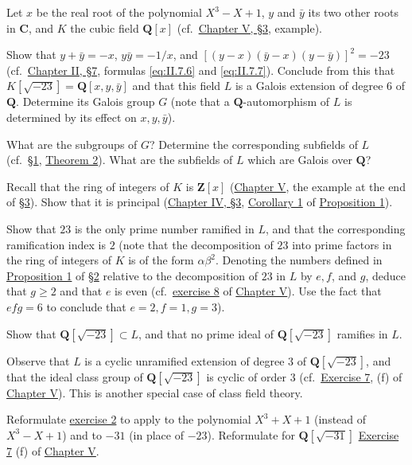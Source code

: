  Let $x$ be the real root of the polynomial $X^{3}-X+1$, $y$ and
$\bar{y}$ its two other roots in $\mathbf{C}$, and $K$ the cubic field
$\mathbf{Q}[x]$ (cf.\ \hyperref[sec:5.3]{Chapter V, §3}, example).
\begin{alist}
\item Show that $y+\bar{y}=-x$, $y\bar{y}=-1/x$, and
$[(y-x)(\bar{y}-x)(y-\bar{y})]^{2}=-23$ (cf.\ \hyperref[sec:2.7]{Chapter II, §7}, formulas
\eqref{eq:II.7.6} and \eqref{eq:II.7.7}). Conclude from this that
$K[\sqrt{-23}]=\mathbf{Q}[x,y,\bar{y}]$ and that this field $L$ is a Galois
extension of degree $6$ of $\mathbf{Q}$. Determine its Galois group $G$
(note that a $\mathbf{Q}$-automorphism of $L$ is determined by its effect on
$x,y,\bar{y}$).
\item What are the subgroups of $G$? Determine the corresponding subfields
of $L$ (cf.\ \hyperref[sec:6.1]{§1}, \hyperref[thm:VI.1.2]{Theorem 2}). What are the subfields of $L$ which are Galois
over $\mathbf{Q}$?
\item Recall that the ring of integers of $K$ is $\mathbf{Z}[x]$ (\hyperref[chap:V]{Chapter V},
the example at the end of \hyperref[sec:5.3]{§3}). Show that it is principal (\hyperref[sec:4.3]{Chapter IV, §3},
\hyperref[cor:IV.3.1]{Corollary 1} of \hyperref[prop:IV.3.1]{Proposition 1}).
\item Show that $23$ is the only prime number ramified in $L$, and that the
corresponding ramification index is $2$ (note that the decomposition of $23$
into prime factors in the ring of integers of $K$ is of the form
$\alpha\beta^{2}$. Denoting the numbers defined in \hyperref[prop:VI.2.1]{Proposition 1} of \hyperref[sec:6.2]{§2}
relative to the decomposition of $23$ in $L$ by $e,f$, and $g$, deduce that
$g\geq2$ and that $e$ is even (cf.\ \hyperref[exer:V.8]{exercise 8} of \hyperref[chap:V]{Chapter V}). Use the fact
that $efg=6$ to conclude that $e=2,f=1,g=3$).
\item Show that $\mathbf{Q}[\sqrt{-23}]\subset L$, and that no prime ideal of
$\mathbf{Q}[\sqrt{-23}]$ ramifies in $L$.
\end{alist}

Observe that $L$ is a cyclic unramified extension of degree $3$ of
$\mathbf{Q}[\sqrt{-23}]$, and that the ideal class group of
$\mathbf{Q}[\sqrt{-23}]$ is cyclic of order $3$ (cf.\ \hyperref[exer:V.7]{Exercise 7}, (f) of
\hyperref[chap:V]{Chapter V}). This is another special case of class field theory.

 Reformulate \hyperref[exer:VI.2]{exercise 2} to apply to the polynomial $X^{3}+X+1$
(instead of $X^{3}-X+1$) and to $-31$ (in place of $-23$). Reformulate for
$\mathbf{Q}[\sqrt{-31}]$ \hyperref[exer:V.7]{Exercise 7} (f) of \hyperref[chap:V]{Chapter V}.

